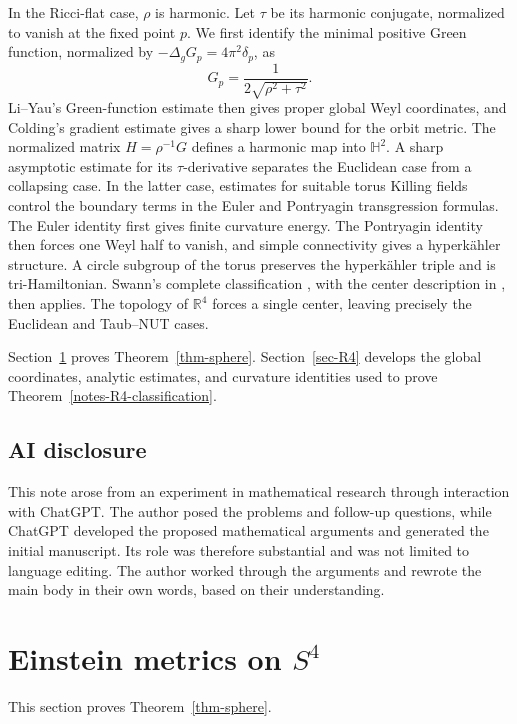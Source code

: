 \documentclass[letterpaper]{amsart}
\theoremstyle{definition}
\theoremstyle{remark}
\begin{document}
In the Ricci-flat case, $\rho$ is harmonic. Let $\tau$ be its harmonic
conjugate, normalized to vanish at the fixed point $p$. We first identify
the minimal positive Green function, normalized by
$-\Delta_g G_p=4\pi^2\delta_p$, as
\[
 G_p=\frac{1}{2\sqrt{\rho^2+\tau^2}}.
\]
Li--Yau's Green-function estimate \cite{notes-LiYau} then gives proper
global Weyl coordinates, and Colding's gradient estimate
\cite{notes-Colding} gives a sharp lower bound for the orbit metric.
The normalized matrix $H=\rho^{-1}G$ defines a harmonic map into
$\mathbb H^2$. A sharp asymptotic estimate for its $\tau$-derivative separates the
Euclidean case from a collapsing case. In the latter case, estimates for
suitable torus Killing fields control the boundary terms in the Euler
and Pontryagin transgression formulas. The Euler identity first gives
finite curvature energy. The Pontryagin identity then forces one Weyl
half to vanish, and simple connectivity gives a hyperk\"ahler structure.
A circle subgroup of the torus preserves the hyperk\"ahler triple and is
tri-Hamiltonian. Swann's complete classification
\cite[Theorem~3.1]{notes-Swann}, with the center description in
\cite[Section~2.2]{notes-DancerSwann}, then applies. The topology of
$\mathbb R^4$ forces a single center, leaving precisely the Euclidean
and Taub--NUT cases.

Section~\ref{sec-sphere} proves Theorem~\ref{thm-sphere}.
Section~\ref{sec-R4} develops the global coordinates, analytic estimates,
and curvature identities used to prove Theorem~\ref{notes-R4-classification}.

\subsection*{AI disclosure}
This note arose from an experiment in mathematical research through
interaction with ChatGPT. The author posed the problems and follow-up
questions, while ChatGPT developed the proposed mathematical arguments
and generated the initial manuscript. Its role was therefore substantial
and was not limited to language editing.
The author worked through the arguments and rewrote the main body in their own words, based on their understanding.

\section{\texorpdfstring{Einstein metrics on $S^4$}{Einstein metrics on S4}}\label{sec-sphere}
This section proves Theorem~\ref{thm-sphere}.
\end{document}
